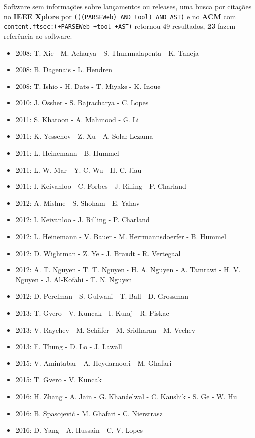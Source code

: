 Software sem informações sobre lançamentos ou releases,
uma busca por citações no {\bf IEEE Xplore} por
\texttt{(((PARSEWeb) AND tool) AND AST)}
e no {\bf ACM} com
\texttt{content.ftsec:(+PARSEWeb +tool +AST)}
retornou
49 resultados,
{\bf 23} fazem referência ao software.

\begin{itemize}
\item 2008: T. Xie - M. Acharya - S. Thummalapenta - K. Taneja
\item 2008: B. Dagenais - L. Hendren
\item 2008: T. Ishio - H. Date - T. Miyake - K. Inoue
\item 2010: J. Ossher - S. Bajracharya - C. Lopes
\item 2011: S. Khatoon - A. Mahmood - G. Li
\item 2011: K. Yessenov - Z. Xu - A. Solar-Lezama
\item 2011: L. Heinemann - B. Hummel
\item 2011: L. W. Mar - Y. C. Wu - H. C. Jiau
\item 2011: I. Keivanloo - C. Forbes - J. Rilling - P. Charland
\item 2012: A. Mishne - S. Shoham - E. Yahav
\item 2012: I. Keivanloo - J. Rilling - P. Charland
\item 2012: L. Heinemann - V. Bauer - M. Herrmannsdoerfer - B. Hummel
\item 2012: D. Wightman - Z. Ye - J. Brandt - R. Vertegaal
\item 2012: A. T. Nguyen - T. T. Nguyen - H. A. Nguyen - A. Tamrawi - H. V. Nguyen - J. Al-Kofahi - T. N. Nguyen
\item 2012: D. Perelman - S. Gulwani - T. Ball - D. Grossman
\item 2013: T. Gvero - V. Kuncak - I. Kuraj - R. Piskac
\item 2013: V. Raychev - M. Sch\"{a}fer - M. Sridharan - M. Vechev
\item 2013: F. Thung - D. Lo - J. Lawall
\item 2015: V. Amintabar - A. Heydarnoori - M. Ghafari
\item 2015: T. Gvero - V. Kuncak
\item 2016: H. Zhang - A. Jain - G. Khandelwal - C. Kaushik - S. Ge - W. Hu
\item 2016: B. Spasojevi\'{c} - M. Ghafari - O. Nierstrasz
\item 2016: D. Yang - A. Hussain - C. V. Lopes
\end{itemize}

